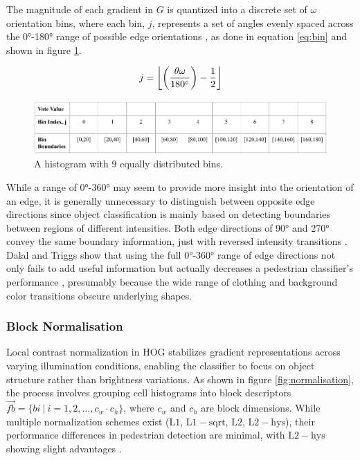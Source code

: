 The magnitude of each gradient in $G$ is quantized into a discrete set of $ \omega $ orientation bins, where each bin, $j$, represents a set of angles evenly spaced across the 0°-180° range of possible edge orientations \cite{dalal_2005_histograms}, as done in equation \ref{eq:bin} and shown in figure \ref{fig:histogram_bins}. 

\begin{equation}
    \label{eq:bin}
    j = \left\lfloor  \left( \frac{\theta \omega}{180 \degree} \right) - \frac{1}{2}  \right\rfloor 
\end{equation}

\begin{figure}
    \centering
    \includegraphics[width=0.75\linewidth]{images/histogram_bins.png}
    \caption{A histogram with 9 equally distributed bins.}
    \label{fig:histogram_bins}
\end{figure}

While a range of 0°-360° may seem to provide more insight into the orientation of an edge, it is generally unnecessary to distinguish between opposite edge directions since object classification is mainly based on detecting boundaries between regions of different intensities. Both edge directions of 90° and 270° convey the same boundary information, just with reversed intensity transitions \cite{shidlovskiy_2020_reducing}. Dalal and Triggs show that using the full 0°-360° range of edge directions not only fails to add useful information but actually decreases a pedestrian classifier's performance \cite{dalal_2005_histograms}, presumably because the wide range of clothing and background color transitions obscure underlying shapes.

\subsubsection{Block Normalisation}

Local contrast normalization in HOG stabilizes gradient representations across varying illumination conditions, enabling the classifier to focus on object structure rather than brightness variations. As shown in figure \ref{fig:normalisation}, the process involves grouping cell histograms into block descriptors $\vec{f{b}} = \{ b{i} \ |\ i=1,2,\dots, c_w \cdot c_h \}$, where $c_w$ and $c_h$ are block dimensions. While multiple normalization schemes exist ($\mathrm{L1}$, $\mathrm{L1-sqrt}$, $\mathrm{L2}$, $\mathrm{L2-hys}$), their performance differences in pedestrian detection are minimal, with $\mathrm{L2-hys}$ showing slight advantages \cite{dalal_2005_histograms}.

